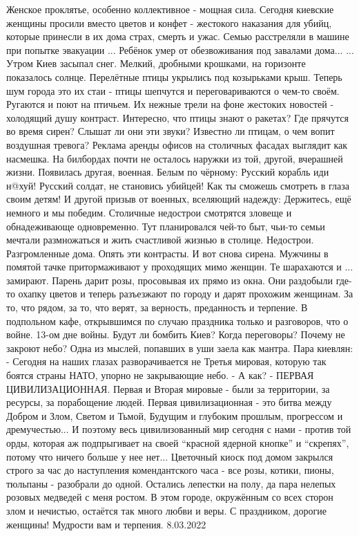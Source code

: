 \obeycr
Женское проклятье, особенно коллективное - мощная сила. Сегодня киевские женщины просили вместо цветов и конфет - жестокого наказания для убийц, которые принесли в их дома страх, смерть и ужас. 
Семью расстреляли в машине при попытке эвакуации ...
Ребёнок умер от обезвоживания под завалами дома... 
... Утром Киев засыпал снег. Мелкий, дробными крошками, на горизонте показалось солнце. Перелётные птицы укрылись под козырьками крыш. Теперь шум города это их стаи - птицы шепчутся и переговариваются о чем-то своём. Ругаются и поют на птичьем. Их нежные трели на фоне жестоких новостей - холодящий душу контраст. 
Интересно, что птицы знают о ракетах? 
Где прячутся во время сирен? 
Слышат ли они эти звуки? 
Известно ли птицам, о чем вопит воздушная тревога?
Реклама аренды офисов на столичных фасадах выглядит как насмешка. 
На билбордах почти не осталось наружки из той, другой, вчерашней жизни. 
Появилась другая, военная. Белым по чёрному:
Русский корабль иди н@хуй!
Русский солдат, не становись убийцей!
Как ты сможешь смотреть в глаза своим детям! 
И другой призыв от военных, вселяющий надежду: Держитесь, ещё немного и мы победим. 
Столичные недострои смотрятся зловеще и обнадеживающе одновременно. Тут планировался чей-то быт, чьи-то семьи мечтали размножаться и жить счастливой жизнью в столице. 
Недострои. Разгромленные дома. Опять эти контрасты. 
И вот снова сирена. Мужчины в помятой тачке притормаживают у проходящих мимо женщин. Те шарахаются и ... замирают. Парень дарит розы, просовывая их прямо из окна. Они раздобыли где-то охапку цветов и теперь разъезжают по городу и дарят прохожим женщинам. За то, что рядом, за то, что верят, за верность, преданность и терпение. 
В подпольном кафе, открывшимся по случаю праздника только и разговоров, что о войне. 
13-ом дне войны. 
Будут ли бомбить Киев? 
Когда переговоры?
Почему не закроют небо?
Одна из мыслей, попавших в уши заела как мантра. Пара киевлян:
- Сегодня на наших глазах разворачивается не Третья мировая, которую так боятся страны НАТО, упорно не закрывающие небо. 
- А как?
- ПЕРВАЯ ЦИВИЛИЗАЦИОННАЯ. 
Первая и Вторая мировые - были за территории, за ресурсы, за порабощение людей.
Первая цивилизационная - это битва между Добром и Злом, Светом и Тьмой, Будущим
и глубоким прошлым, прогрессом и дремучестью... И поэтому весь цивилизованный
мир сегодня с нами - против той орды, которая аж подпрыгивает на своей \enquote{красной
ядерной кнопке} и \enquote{скрепях}, потому что ничего больше у нее нет...
Цветочный киоск под домом закрылся строго за час до наступления комендантского часа - все розы, котики, пионы, тюльпаны - разобрали до одной. Остались лепестки на полу, да пара нелепых розовых медведей с меня ростом.
В этом городе, окружённым со всех сторон злом и нечистью, остаётся так много любви и веры. 
С праздником, дорогие женщины!
Мудрости вам и терпения.
8.03.2022
\restorecr

